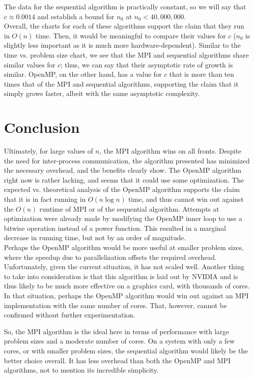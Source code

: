 \documentclass{article}
\begin{document}
The data for the sequential algorithm is practically constant, so we will say that $c \approx 0.0014$ and establish a bound for $n_0$ at $n_0 < 40,000,000$. \\

Overall, the charts for each of these algorithms support the claim that they run in $O(n)$ time.  Then, it would be meaningful to compare their values for $c$ ($n_0$ is slightly less important as it is much more hardware-dependent). Similar to the time vs. problem size chart, we see that the MPI and sequential algorithms share similar values for $c$; thus, we can say that their asymptotic rate of growth is similar.  OpenMP, on the other hand, has a value for $c$ that is more than ten times that of the MPI and sequential algorithms, supporting the claim that it simply grows faster, albeit with the same asymptotic complexity.

\section{Conclusion}
Ultimately, for large values of $n$, the MPI algorithm wins on all fronts.  Despite the need for inter-process communication, the algorithm presented has minimized the necessary overhead, and the benefits clearly show.  The OpenMP algorithm right now is rather lacking, and seems that it could use some optimization.  The expected vs. theoretical analysis of the OpenMP algorithm supports the claim that it is in fact running in $O(n \log n)$ time, and thus cannot win out against the $O(n)$ runtime of MPI or of the sequential algorithm.  Attempts at optimization were already made by modifying the OpenMP inner loop to use a bitwise operation instead of a power function.  This resulted in a marginal decrease in running time, but not by an order of magnitude. \\

Perhaps the OpenMP algorithm would be more useful at smaller problem sizes, where the speedup due to parallelization offsets the required overhead.  Unfortunately, given the current situation, it has not scaled well.  Another thing to take into consideration is that this algorithm is laid out by NVIDIA and is thus likely to be much more effective on a graphics card, with thousands of cores.  In that situation, perhaps the OpenMP algorithm would win out against an MPI implementation with the same number of cores.  That, however, cannot be confirmed without further experimentation.

So, the MPI algorithm is the ideal here in terms of performance with large problem sizes and a moderate number of cores.  On a system with only a few cores, or with smaller problem sizes, the sequential algorithm would likely be the better choice overall.  It has less overhead than both the OpenMP and MPI algorithms, not to mention its incredible simplicity.
\end{document}
